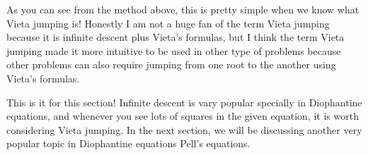 \documentclass[../../main.tex]{subfiles}
\begin{document}
As you can see from the method above, this is pretty simple when
we know what Vieta jumping is! Honestly I am not a huge fan of
the term Vieta jumping because it is infinite descent plus
Vieta's formulas, but I think the term Vieta jumping made it
more intuitive to be used in other type of problems because other
problems can also require jumping from one root to the another
using Vieta's formulas.

This is it for this section! Infinite descent is vary popular
specially in Diophantine equations, and whenever you see
lots of squares in the given equation, it is worth considering
Vieta jumping. In the next section, we will be discussing another
very popular topic in Diophantine equations Pell's equations.
\end{document}
